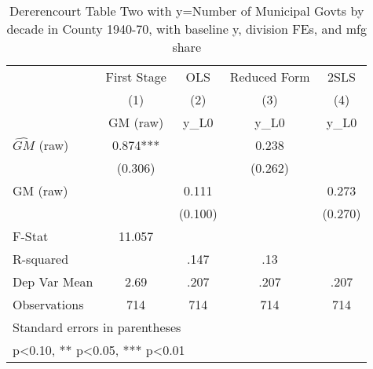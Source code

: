 \begin{table}[htbp]\centering
\def\sym#1{\ifmmode^{#1}\else\(^{#1}\)\fi}
\caption{Dererencourt Table Two with y=Number of Municipal Govts by decade in County 1940-70, with baseline y, division FEs, and mfg share}
\begin{tabular}{l*{4}{c}}
\toprule
                    & First Stage   &         OLS   &Reduced Form   &        2SLS   \\
                    &\multicolumn{1}{c}{(1)}&\multicolumn{1}{c}{(2)}&\multicolumn{1}{c}{(3)}&\multicolumn{1}{c}{(4)}\\
                    &\multicolumn{1}{c}{GM  (raw)}&\multicolumn{1}{c}{y\_L0}&\multicolumn{1}{c}{y\_L0}&\multicolumn{1}{c}{y\_L0}\\
\midrule
$\hat{GM}$ (raw)    &       0.874***&               &       0.238   &               \\
                    &     (0.306)   &               &     (0.262)   &               \\
\addlinespace
GM  (raw)           &               &       0.111   &               &       0.273   \\
                    &               &     (0.100)   &               &     (0.270)   \\
\midrule
F-Stat              &      11.057   &               &               &               \\
R-squared           &               &        .147   &         .13   &               \\
Dep Var Mean        &        2.69   &        .207   &        .207   &        .207   \\
Observations        &         714   &         714   &         714   &         714   \\
\bottomrule
\multicolumn{5}{l}{\footnotesize Standard errors in parentheses}\\
\multicolumn{5}{l}{\footnotesize * p<0.10, ** p<0.05, *** p<0.01}\\
\end{tabular}
\end{table}
